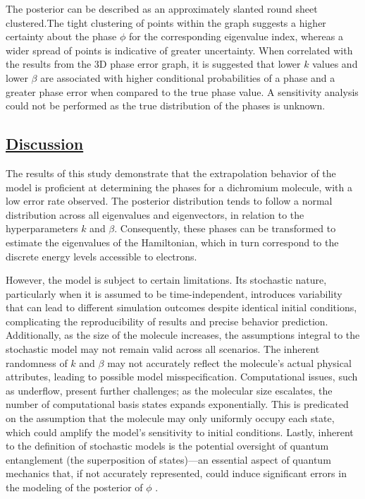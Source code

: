 \documentclass[
]{article}
\begin{document}
The posterior can be described as an approximately slanted round sheet
clustered.The tight clustering of points within the graph suggests a
higher certainty about the phase \(\phi\) for the corresponding
eigenvalue index, whereas a wider spread of points is indicative of
greater uncertainty. When correlated with the results from the 3D phase
error graph, it is suggested that lower \(k\) values and lower \(\beta\)
are associated with higher conditional probabilities of a phase and a
greater phase error when compared to the true phase value. A sensitivity
analysis could not be performed as the true distribution of the phases
is unknown.

\subsection*{\texorpdfstring{\underline{Discussion}}{}}\label{section-6}

The results of this study demonstrate that the extrapolation behavior of
the model is proficient at determining the phases for a dichromium
molecule, with a low error rate observed. The posterior distribution
tends to follow a normal distribution across all eigenvalues and
eigenvectors, in relation to the hyperparameters \(k\) and \(\beta\).
Consequently, these phases can be transformed to estimate the
eigenvalues of the Hamiltonian, which in turn correspond to the discrete
energy levels accessible to electrons.

However, the model is subject to certain limitations. Its stochastic
nature, particularly when it is assumed to be time-independent,
introduces variability that can lead to different simulation outcomes
despite identical initial conditions, complicating the reproducibility
of results and precise behavior prediction. Additionally, as the size of
the molecule increases, the assumptions integral to the stochastic model
may not remain valid across all scenarios. The inherent randomness of
\(k\) and \(\beta\) may not accurately reflect the molecule's actual
physical attributes, leading to possible model misspecification.
Computational issues, such as underflow, present further challenges; as
the molecular size escalates, the number of computational basis states
expands exponentially. This is predicated on the assumption that the
molecule may only uniformly occupy each state, which could amplify the
model's sensitivity to initial conditions. Lastly, inherent to the
definition of stochastic models is the potential oversight of quantum
entanglement (the superposition of states)---an essential aspect of
quantum mechanics that, if not accurately represented, could induce
significant errors in the modeling of the posterior of \(\phi\)
\cite{Yamamoto2023}.
\end{document}
